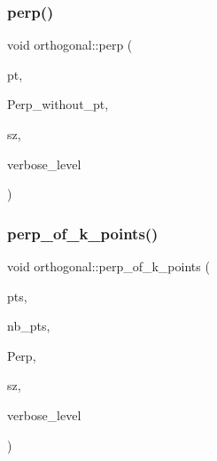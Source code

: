 \subsubsection{\texorpdfstring{perp()}{perp()}}
{\footnotesize\ttfamily void orthogonal\+::perp (\begin{DoxyParamCaption}\item[{\mbox{\hyperlink{galois_8h_a09fddde158a3a20bd2dcadb609de11dc}{I\+NT}}}]{pt,  }\item[{\mbox{\hyperlink{galois_8h_a09fddde158a3a20bd2dcadb609de11dc}{I\+NT}} $\ast$}]{Perp\+\_\+without\+\_\+pt,  }\item[{\mbox{\hyperlink{galois_8h_a09fddde158a3a20bd2dcadb609de11dc}{I\+NT}} \&}]{sz,  }\item[{\mbox{\hyperlink{galois_8h_a09fddde158a3a20bd2dcadb609de11dc}{I\+NT}}}]{verbose\+\_\+level }\end{DoxyParamCaption})}

\mbox{\label{classorthogonal_a6a92a4680dc76bb289141fc5c765f5fb}} 
\subsubsection{\texorpdfstring{perp\+\_\+of\+\_\+k\+\_\+points()}{perp\_of\_k\_points()}}
{\footnotesize\ttfamily void orthogonal\+::perp\+\_\+of\+\_\+k\+\_\+points (\begin{DoxyParamCaption}\item[{\mbox{\hyperlink{galois_8h_a09fddde158a3a20bd2dcadb609de11dc}{I\+NT}} $\ast$}]{pts,  }\item[{\mbox{\hyperlink{galois_8h_a09fddde158a3a20bd2dcadb609de11dc}{I\+NT}}}]{nb\+\_\+pts,  }\item[{\mbox{\hyperlink{galois_8h_a09fddde158a3a20bd2dcadb609de11dc}{I\+NT}} $\ast$\&}]{Perp,  }\item[{\mbox{\hyperlink{galois_8h_a09fddde158a3a20bd2dcadb609de11dc}{I\+NT}} \&}]{sz,  }\item[{\mbox{\hyperlink{galois_8h_a09fddde158a3a20bd2dcadb609de11dc}{I\+NT}}}]{verbose\+\_\+level }\end{DoxyParamCaption})}

\mbox{\label{classorthogonal_a6a05fef2e61ed508bff66d6728c58ec0}} 
